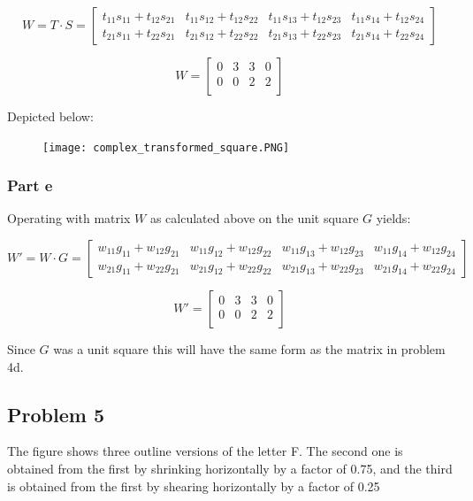 \documentclass{article}
\begin{document}
\[ 
W = T \cdot S = 
\begin{bmatrix}
    t_{11}s_{11} + t_{12}s_{21} & t_{11}s_{12} + t_{12}s_{22} & t_{11}s_{13} + t_{12}s_{23} & t_{11}s_{14} + t_{12}s_{24} \\
    t_{21}s_{11} + t_{22}s_{21} & t_{21}s_{12} + t_{22}s_{22} & t_{21}s_{13} + t_{22}s_{23} & t_{21}s_{14} + t_{22}s_{24}
\end{bmatrix}
\]

\[W = 
\begin{bmatrix}
    0 & 3 & 3 & 0 \\
    0 & 0 & 2 & 2 \\
\end{bmatrix}
\]

Depicted below:
\begin{figure}[H]
  \centering
  \texttt{[image: complex\_transformed\_square.PNG]}
  \label{fig3}
\end{figure}


\subsubsection*{Part e}

Operating with matrix $W$ as calculated above on the unit square $G$ yields:

\[ 
W' = W \cdot G = 
\begin{bmatrix}
    w_{11}g_{11} + w_{12}g_{21} & w_{11}g_{12} + w_{12}g_{22} & w_{11}g_{13} + w_{12}g_{23} & w_{11}g_{14} + w_{12}g_{24} \\
    w_{21}g_{11} + w_{22}g_{21} & w_{21}g_{12} + w_{22}g_{22} & w_{21}g_{13} + w_{22}g_{23} & w_{21}g_{14} + w_{22}g_{24}
\end{bmatrix}
\]

\[W' = 
\begin{bmatrix}
    0 & 3 & 3 & 0 \\
    0 & 0 & 2 & 2 \\
\end{bmatrix}
\]

Since $G$ was a unit square this will have the same form as the matrix in problem 4d.

\subsection*{Problem 5}

The figure shows three outline versions of the letter F. The second one is obtained from the first by shrinking horizontally by a factor of 0.75, and the third is obtained from the first by shearing horizontally by a factor of 0.25
\end{document}
